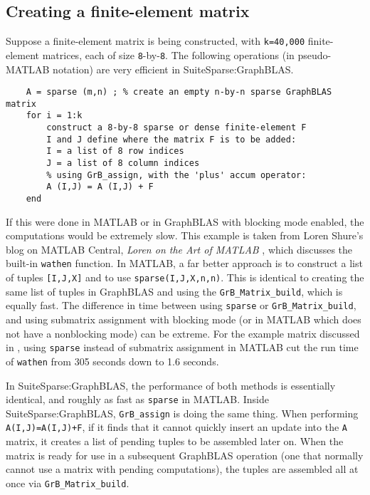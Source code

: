 \documentclass[12pt]{article}
\begin{document}
\newpage
\subsection{Creating a finite-element matrix}
\label{fem}

Suppose a finite-element matrix is being constructed, with \verb'k=40,000'
finite-element matrices, each of size \verb'8'-by-\verb'8'.  The following
operations (in pseudo-MATLAB notation) are very efficient in
SuiteSparse:GraphBLAS.

    {\footnotesize
    \begin{verbatim}
    A = sparse (m,n) ; % create an empty n-by-n sparse GraphBLAS matrix
    for i = 1:k
        construct a 8-by-8 sparse or dense finite-element F
        I and J define where the matrix F is to be added:
        I = a list of 8 row indices
        J = a list of 8 column indices
        % using GrB_assign, with the 'plus' accum operator:
        A (I,J) = A (I,J) + F
    end \end{verbatim}}

If this were done in MATLAB or in GraphBLAS with blocking mode enabled, the
computations would be extremely slow.  This example is taken from Loren Shure's
blog on MATLAB Central, {\em Loren on the Art of MATLAB} \cite{Davis07},
which discusses the built-in \verb'wathen' function.  In
MATLAB, a far better approach is to construct a list of tuples \verb'[I,J,X]'
and to use \verb'sparse(I,J,X,n,n)'. This is identical to creating the same
list of tuples in GraphBLAS and using the \verb'GrB_Matrix_build', which is
equally fast.  The difference in time between using \verb'sparse' or
\verb'GrB_Matrix_build', and using submatrix assignment with blocking mode (or
in MATLAB which does not have a nonblocking mode) can be extreme.  For the
example matrix discussed in \cite{Davis07}, using \verb'sparse' instead of
submatrix assignment in MATLAB cut the run time of \verb'wathen' from 305
seconds down to 1.6 seconds.

In SuiteSparse:GraphBLAS, the performance of both methods is essentially
identical, and roughly as fast as \verb'sparse' in MATLAB.  Inside
SuiteSparse:GraphBLAS, \verb'GrB_assign' is doing the same thing. When
performing \verb'A(I,J)=A(I,J)+F', if it finds that it cannot quickly insert an
update into the \verb'A' matrix, it creates a list of pending tuples to be
assembled later on.   When the matrix is ready for use in a subsequent
GraphBLAS operation (one that normally cannot use a matrix with pending
computations), the tuples are assembled all at once via
\verb'GrB_Matrix_build'.
\end{document}

